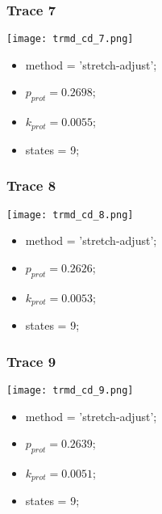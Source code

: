 \subsubsection{Trace 7}
\begin{minipage}[c]{0.7\textwidth}
	\texttt{[image: trmd\_cd\_7.png]}
\end{minipage}
\hfill
\begin{minipage}[c]{0.45\textwidth}
	\begin{itemize}
		\item method = 'stretch-adjust';
		\item $p_{prot}=0.2698$;
		\item $k_{prot}=0.0055$;
		\item states = 9;
	\end{itemize}
\end{minipage}

\subsubsection{Trace 8}
\begin{minipage}[c]{0.7\textwidth}
	\texttt{[image: trmd\_cd\_8.png]}
\end{minipage}
\hfill
\begin{minipage}[c]{0.45\textwidth}
	\begin{itemize}
		\item method = 'stretch-adjust';
		\item $p_{prot}=0.2626$;
		\item $k_{prot}=0.0053$;
		\item states = 9;
	\end{itemize}
\end{minipage}

\subsubsection{Trace 9}
\begin{minipage}[c]{0.7\textwidth}
	\texttt{[image: trmd\_cd\_9.png]}
\end{minipage}
\hfill
\begin{minipage}[c]{0.45\textwidth}
	\begin{itemize}
		\item method = 'stretch-adjust';
		\item $p_{prot}=0.2639$;
		\item $k_{prot}=0.0051$;
		\item states = 9;
	\end{itemize}
\end{minipage}

